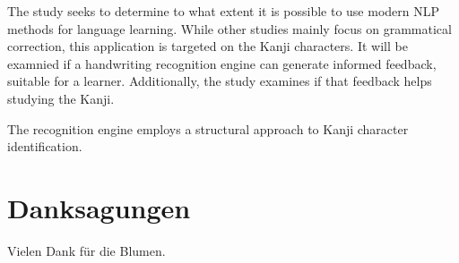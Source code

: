 The study seeks to determine to what extent it is possible to use modern NLP 
methods for language learning. While other studies mainly focus on grammatical
correction, this application is targeted on the Kanji characters. It will be 
examnied if a handwriting recognition engine can generate informed feedback,
suitable for a learner. Additionally, the study examines if that feedback helps 
studying the Kanji.

The recognition engine employs a structural approach to Kanji character 
identification. 




\chapter*{Danksagungen}
\label{chap:danksagungen}

Vielen Dank für die Blumen.
